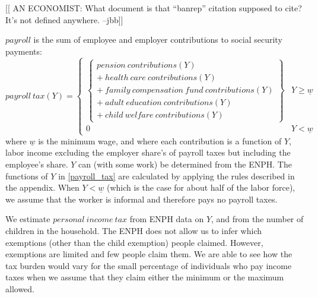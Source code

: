 \documentclass[12pt]{article}
\begin{document}
[[ AN ECONOMIST:
    What document is that ``banrep'' citation supposed to cite?
    It's not defined anywhere.
    --jbb]]
\fi

$payroll$ is the sum of employee and employer contributions to social security payments:
\begin{equation}
  \label{payroll_tax}
  payroll\ tax(Y) = \begin{cases}
    \left\{ \begin{array}{cc}
      pension\ contributions(Y)                       \\
      +\ health\ care\ contributions(Y)               \\
      +\ family\ compensation\ fund\ contributions(Y) \\
      +\ adult\ education\ contributions(Y)           \\
      +\ child\ welfare\ contributions(Y)
    \end{array} \right\}
    & Y \geq \underline{w} \\
    0 & Y < \underline{w}
    \end{cases}
\end{equation}
where $\underline{w}$ is the minimum wage,
and where each contribution is a function of $Y$,
labor income excluding the employer share's of payroll taxes
but including the employee's share.
$Y$ can (with some work) be determined from the ENPH.
The functions of $Y$ in \ref{payroll_tax} are calculated by
applying the rules described in the appendix.
When $Y < \underline{w}$
(which is the case for about half of the labor force),
we assume that the worker is informal and therefore pays no payroll taxes.

We estimate $personal\ income\ tax$ from ENPH data on $Y$,
and from the number of children in the household.
The ENPH does not allow us to infer which exemptions
(other than the child exemption) people claimed.
However, exemptions are limited and few people claim them.
We are able to see how the tax burden would vary
for the small percentage of individuals who pay income taxes
when we assume that they claim either the minimum or the maximum allowed.
\end{document}
